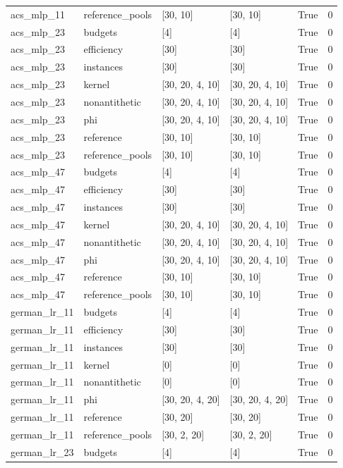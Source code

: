 \begin{tabular}{llllll}
acs\_mlp\_11 & reference\_pools & [30, 10] & [30, 10] & True & 0 \\
acs\_mlp\_23 & budgets & [4] & [4] & True & 0 \\
acs\_mlp\_23 & efficiency & [30] & [30] & True & 0 \\
acs\_mlp\_23 & instances & [30] & [30] & True & 0 \\
acs\_mlp\_23 & kernel & [30, 20, 4, 10] & [30, 20, 4, 10] & True & 0 \\
acs\_mlp\_23 & nonantithetic & [30, 20, 4, 10] & [30, 20, 4, 10] & True & 0 \\
acs\_mlp\_23 & phi & [30, 20, 4, 10] & [30, 20, 4, 10] & True & 0 \\
acs\_mlp\_23 & reference & [30, 10] & [30, 10] & True & 0 \\
acs\_mlp\_23 & reference\_pools & [30, 10] & [30, 10] & True & 0 \\
acs\_mlp\_47 & budgets & [4] & [4] & True & 0 \\
acs\_mlp\_47 & efficiency & [30] & [30] & True & 0 \\
acs\_mlp\_47 & instances & [30] & [30] & True & 0 \\
acs\_mlp\_47 & kernel & [30, 20, 4, 10] & [30, 20, 4, 10] & True & 0 \\
acs\_mlp\_47 & nonantithetic & [30, 20, 4, 10] & [30, 20, 4, 10] & True & 0 \\
acs\_mlp\_47 & phi & [30, 20, 4, 10] & [30, 20, 4, 10] & True & 0 \\
acs\_mlp\_47 & reference & [30, 10] & [30, 10] & True & 0 \\
acs\_mlp\_47 & reference\_pools & [30, 10] & [30, 10] & True & 0 \\
german\_lr\_11 & budgets & [4] & [4] & True & 0 \\
german\_lr\_11 & efficiency & [30] & [30] & True & 0 \\
german\_lr\_11 & instances & [30] & [30] & True & 0 \\
german\_lr\_11 & kernel & [0] & [0] & True & 0 \\
german\_lr\_11 & nonantithetic & [0] & [0] & True & 0 \\
german\_lr\_11 & phi & [30, 20, 4, 20] & [30, 20, 4, 20] & True & 0 \\
german\_lr\_11 & reference & [30, 20] & [30, 20] & True & 0 \\
german\_lr\_11 & reference\_pools & [30, 2, 20] & [30, 2, 20] & True & 0 \\
german\_lr\_23 & budgets & [4] & [4] & True & 0 \\

\end{tabular}
